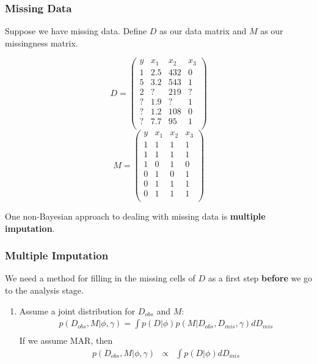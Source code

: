 \documentclass[handout]{beamer}
\begin{document}
\begin{frame}
\frametitle{Missing Data}
\pause
Suppose we have missing data.  \pause Define $D$ as our data matrix
and $M$ as our missingness matrix.
\pause
\setlength{\columnseprule}{0pt}
\begin{multicols}{2}
$$
D = \left( \begin{array}{cccc}
y & x_1 & x_2 & x_3\\
1 & 2.5 & 432 & 0 \\
5 & 3.2 & 543 & 1 \\
2 & ? & 219 & ? \\
? & 1.9 & ? & 1  \\
? & 1.2 & 108 & 0 \\
? & 7.7 & 95 & 1 \\
\end{array} \right)
$$
\newpage
$$
M = \left( \begin{array}{cccc}
y & x_1 & x_2 & x_3\\
1 & 1 & 1 & 1 \\
1 & 1 & 1 & 1 \\
1 & 0 & 1 & 0 \\
0 & 1 & 0 & 1  \\
0 & 1 & 1 & 1 \\
0 & 1 & 1 & 1 \\
\end{array} \right)
$$
\end{multicols}
\pause
\bigskip
One non-Bayesian approach to dealing with missing data is {\bf
multiple imputation}.
\end{frame}

\begin{frame}
\frametitle{Multiple Imputation}
\pause
We need a method for filling in the missing cells of $D$ as a first
step {\bf before} we go to the analysis stage. 
\bigskip
\pause
\begin{enumerate}
\item Assume a joint distribution for $D_{obs}$ and $M$:
\pause
\begin{eqnarray*}
p(D_{obs}, M | \phi, \gamma) = \int p(D | \phi) p(M |
D_{obs}, D_{mis}, \gamma) dD_{mis} \\
\end{eqnarray*}
\pause
If we assume MAR, then 
\begin{eqnarray*}
p(D_{obs}, M | \phi, \gamma) &\propto& \int p(D | \phi) dD_{mis} \\
\end{eqnarray*}
\end{enumerate}
\end{frame}
\end{document}
